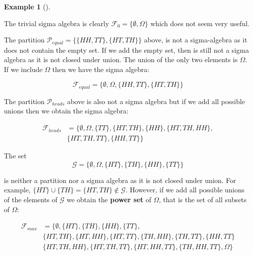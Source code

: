 \documentclass[
  letterpaper,
]{scrbook}
\theoremstyle{definition}
\theoremstyle{plain}
\theoremstyle{plain}
\theoremstyle{definition}
\newtheorem{example}{Example}[chapter]
\theoremstyle{remark}
\begin{document}
\begin{tcolorbox}[enhanced jigsaw, bottomtitle=1mm, coltitle=black, toprule=.15mm, toptitle=1mm, bottomrule=.15mm, colback=white, arc=.35mm, opacityback=0, breakable, title={Examples of sigma-algebras}, titlerule=0mm, rightrule=.15mm, colbacktitle=quarto-callout-note-color!10!white, colframe=quarto-callout-note-color-frame, opacitybacktitle=0.6, leftrule=.75mm, left=2mm]

\begin{example}[]\protect\hypertarget{exm-sigma-algebra}{}\label{exm-sigma-algebra}

The trivial sigma algebra is clearly
\(\mathcal F_0=\{\emptyset, \Omega\}\) which does not seem very useful.

The partition \(\mathcal P_{equal}=\{\{HH,TT\}, \{HT,TH\}\}\) above, is
not a sigma-algebra as it does not contain the empty set. If we add the
empty set, then is still not a sigma algebra as it is not closed under
union. The union of the only two elements is \(\Omega\). If we include
\(\Omega\) then we have the sigma algebra:

\[
\mathcal F_{equal}=\{\emptyset, \Omega, \{HH,TT\}, \{HT,TH\}\}
\]

The partition \(\mathcal P_{heads}\) above is also not a sigma algebra
but if we add all possible unions then we obtain the sigma algebra:

\[
\begin{aligned}
\mathcal F_{heads}& =\{\emptyset, \Omega, \{TT\}, \{HT,TH\}, \{HH\}, \{HT,TH,HH\},\\
 & \{HT,TH,TT\}, \{HH,TT\}\}
\end{aligned}
\]

The set \[
\mathcal G =\{\emptyset,\Omega,\{HT\},\{TH\},\{HH\},\{TT\}\}
\]

is neither a partition nor a sigma algebra as it is not closed under
union. For example, \(\{HT\}\cup \{TH\}=\{HT,TH\}\notin \mathcal G\).
However, if we add all possible unions of the elements of \(\mathcal G\)
we obtain the \textbf{power set} of \(\Omega\), that is the set of all
subsets of \(\Omega\):

\[
\begin{aligned}
\mathcal F_{max} &= \{\emptyset,  \{HT\},\{TH\},\{HH\},\{TT\},\\
&  \{HT,TH\}, \{HT,HH\}, \{HT,TT\}, \{TH,HH\}, \{TH,TT\}, \{HH,TT\}\\
&  \{HT,TH,HH\}, \{HT,TH,TT\}, \{HT,HH,TT\}, \{TH,HH,TT\},\Omega \}
\end{aligned}
\]


\end{example}
\end{tcolorbox}
\end{document}
